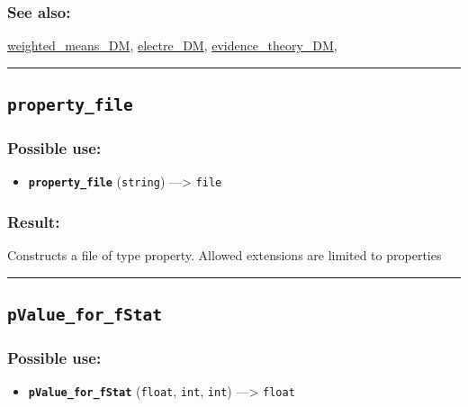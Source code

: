 \documentclass[]{book}
\providecommand{\tightlist}{%
  \setlength{\itemsep}{0pt}\setlength{\parskip}{0pt}}
\theoremstyle{definition}
\theoremstyle{definition}
\theoremstyle{definition}
\theoremstyle{remark}
\begin{document}
\subsubsection{See also:}\label{see-also-170}

\href{OperatorsSZ\#weighted_means_dm}{weighted\_means\_DM},
\href{OperatorsDH\#electre_dm}{electre\_DM},
\href{OperatorsDH\#evidence_theory_dm}{evidence\_theory\_DM},

\begin{center}\rule{0.5\linewidth}{\linethickness}\end{center}

\subsection{\texorpdfstring{\texttt{property\_file}}{property\_file}}\label{property_file}

\subsubsection{Possible use:}\label{possible-use-420}

\begin{itemize}
\tightlist
\item
  \textbf{\texttt{property\_file}} (\texttt{string}) ---\textgreater{}
  \texttt{file}
\end{itemize}

\subsubsection{Result:}\label{result-406}

Constructs a file of type property. Allowed extensions are limited to
properties

\begin{center}\rule{0.5\linewidth}{\linethickness}\end{center}

\subsection{\texorpdfstring{\texttt{pValue\_for\_fStat}}{pValue\_for\_fStat}}\label{pvalue_for_fstat}

\subsubsection{Possible use:}\label{possible-use-421}

\begin{itemize}
\tightlist
\item
  \textbf{\texttt{pValue\_for\_fStat}} (\texttt{float}, \texttt{int},
  \texttt{int}) ---\textgreater{} \texttt{float}
\end{itemize}
\end{document}
